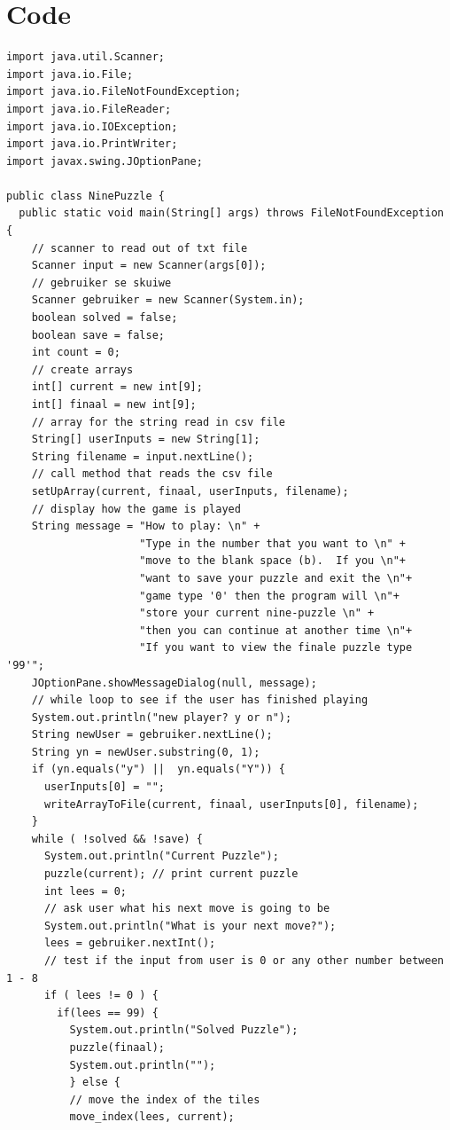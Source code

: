 \documentclass[10pt]{article}
\begin{document}
\section*{Code}
 \begin{tiny}
  \begin{verbatim}
import java.util.Scanner;
import java.io.File;
import java.io.FileNotFoundException;
import java.io.FileReader;
import java.io.IOException;
import java.io.PrintWriter;
import javax.swing.JOptionPane;

public class NinePuzzle {  
  public static void main(String[] args) throws FileNotFoundException {
    // scanner to read out of txt file
    Scanner input = new Scanner(args[0]);
    // gebruiker se skuiwe
    Scanner gebruiker = new Scanner(System.in);
    boolean solved = false;
    boolean save = false;
    int count = 0;
    // create arrays
    int[] current = new int[9];
    int[] finaal = new int[9];
    // array for the string read in csv file
    String[] userInputs = new String[1];
    String filename = input.nextLine();
    // call method that reads the csv file
    setUpArray(current, finaal, userInputs, filename);  
    // display how the game is played
    String message = "How to play: \n" +
	                 "Type in the number that you want to \n" +
                     "move to the blank space (b).  If you \n"+
					 "want to save your puzzle and exit the \n"+
					 "game type '0' then the program will \n"+
					 "store your current nine-puzzle \n" +
                     "then you can continue at another time \n"+
					 "If you want to view the finale puzzle type '99'";
    JOptionPane.showMessageDialog(null, message);
    // while loop to see if the user has finished playing
	System.out.println("new player? y or n");
	String newUser = gebruiker.nextLine();
	String yn = newUser.substring(0, 1);
	if (yn.equals("y") ||  yn.equals("Y")) {
	  userInputs[0] = "";
      writeArrayToFile(current, finaal, userInputs[0], filename);
	}
    while ( !solved && !save) {
      System.out.println("Current Puzzle");
      puzzle(current); // print current puzzle
      int lees = 0;
      // ask user what his next move is going to be
      System.out.println("What is your next move?");
      lees = gebruiker.nextInt();
      // test if the input from user is 0 or any other number between 1 - 8
      if ( lees != 0 ) {
        if(lees == 99) {
          System.out.println("Solved Puzzle");
          puzzle(finaal);
          System.out.println("");
          } else {
          // move the index of the tiles
          move_index(lees, current);

\end{verbatim}
\end{tiny}
\end{document}
